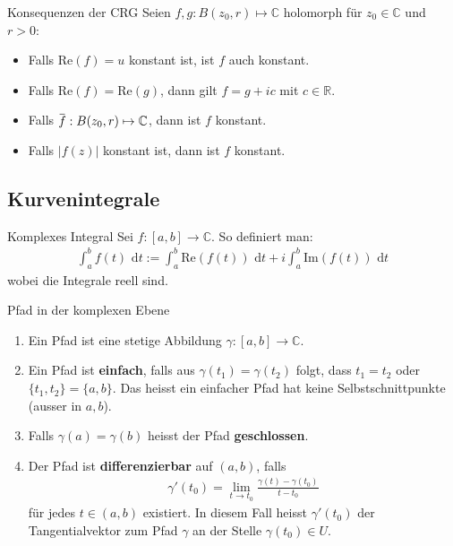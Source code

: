 \documentclass[a4paper,10pt]{article}
\def\R{\mathbb{R}}
\def\C{\mathbb{C}}
\def\dt{\text{ d}t}
\def\Re{\text{Re}}
\def\Im{\text{Im}}
\newcommand{\overbar}[1]{\mkern 1.5mu\overline{\mkern-1.5mu#1\mkern-1.5mu}\mkern 1.5mu}
\begin{document}
\begin{subbox}{Konsequenzen der CRG}
  Seien $f, g: B(z_0, r) \mapsto \C$ holomorph für $z_0 \in \C$ und $r > 0$:
  \begin{itemize}
    \item Falls $\Re(f) = u$ konstant ist, ist $f$ auch konstant.
    \item Falls $\Re(f) = \Re(g)$, dann gilt $f = g + ic$ mit $c \in \R$.
    \item Falls $\overbar{f}: B(z_0, r) \mapsto \C$, dann ist $f$ konstant.
    \item Falls $|f(z)|$ konstant ist, dann ist $f$ konstant.
  \end{itemize}
\end{subbox}

\subsection{Kurvenintegrale}

\begin{mainbox}{Komplexes Integral}
  Sei \(f \colon [a,b] \to \mathbb{C}\). So definiert man:
  \begin{align*}
    \int_a^b f(t) \dt:=\int_a^b \Re(f(t)) \dt + i \int_a^b \Im(f(t)) \dt 
  \end{align*}
  wobei die Integrale reell sind.
\end{mainbox}

\begin{mainbox}{Pfad in der komplexen Ebene}
  \begin{enumerate}
    \item Ein Pfad ist eine stetige Abbildung \(\gamma\colon[a,b]\to\mathbb{C}\).
    \item Ein Pfad ist \textbf{einfach}, falls aus \(\gamma(t_1)=\gamma(t_2)\) folgt, dass \(t_1=t_2\) oder \(\{t_1,t_2\}=\{a,b\}\). Das heisst ein einfacher Pfad hat keine Selbstschnittpunkte (ausser in $a,b$).
    \item Falls \(\gamma(a)=\gamma(b)\) heisst der Pfad \textbf{geschlossen}.
    \item Der Pfad ist \textbf{differenzierbar} auf \((a,b)\), falls \begin{align*} \gamma'(t_0)= \lim_{t \to t_0} \frac{\gamma (t) - \gamma (t_0)}{t-t_0} \end{align*} für jedes \(t\in(a,b)\) existiert. In diesem Fall heisst \(\gamma'(t_0)\) der Tangentialvektor zum Pfad \(\gamma\) an der Stelle \(\gamma(t_0)\in U\).
  \end{enumerate}
\end{mainbox}
\end{document}
